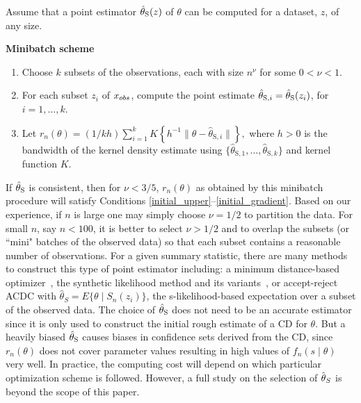 Assume that a point estimator $\htheta(z)$ of $\theta$ can be computed for a dataset, $z$, of any size. 
	
\begin{description}
\item [\textbf{Minibatch scheme}]  
\end{description}
\begin{enumerate}
	\item Choose $k$ subsets of the observations, each with size $n^{\nu}$ for some $0<\nu<1$. 
	\item For each subset $z_{i}$ of $x_{\rm obs}$, compute the point estimate $\hat{\theta}_{\text{S},i}=\htheta(z_{i})$, for $i=1,\ldots,k$. 
	\item Let $r_{n}(\theta)=(1/ kh) \sum_{i=1}^{k}K\left\{h^{-1}\|\theta-\hat{\theta}_{\text{S},i}\|\right\},$ where $h>0$ is the bandwidth of the kernel density  estimate using $\{\hat{\theta}_{\text{S},1},\ldots,\hat{\theta}_{\text{S},k}\}$ and kernel function $K$.
\end{enumerate}

	
If $\htheta$ is consistent, then 
for $\nu<3/5$, $r_{n}(\theta)$ as obtained by this minibatch procedure will satisfy Conditions \ref{initial_upper}--\ref{initial_gradient}. Based on our experience, if $n$ is large one may simply choose $\nu =1/2$ to partition the data. For small $n$, say $n<100$, it is better to select $\nu>1/2$ and to overlap the subsets (or ``mini" batches of the observed data) so that each subset contains a reasonable number of observations. For a given  summary statistic, there are many methods to construct this type of point estimator including:
a minimum distance-based optimizer~\cite[]{Gourieroux1993,mcfadden1989method}, the synthetic likelihood method and its variants~\cite[]{wood2010statistical,fasiolo2018extended}, or accept-reject ACDC %
with $\hat{\theta}_{S} = E\{\theta\mid S_{n}(z_i)\}$, the s-likelihood-based expectation over a subset of the observed data. The choice of $\htheta$ does not need to be an accurate estimator %
since it is only used to construct the initial rough estimate of a CD for $\theta$. But a heavily biased $\htheta$ causes biases in confidence sets derived from the CD, since %
$r_n(\theta)$ does not cover parameter values resulting in high values of $f_n(s\mid\theta)$ very well. In practice, the computing cost 
will depend on which particular optimization scheme is followed. However, a full study on the selection of $\hat{\btheta}_S$ is beyond the scope of this paper. 
	
